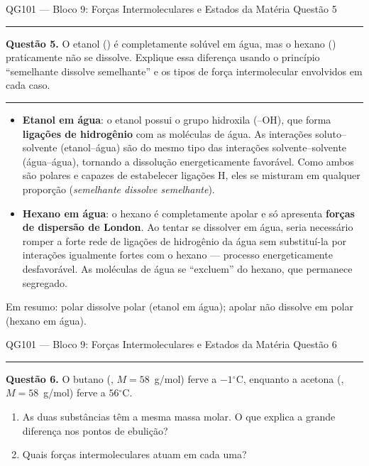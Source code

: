 \documentclass[10pt,a4paper]{article}
\newcommand{\oC}{$^\circ$C}
\newcommand{\questaoheader}[1]{%
  \begin{center}
  {\small\sffamily QG101 --- Bloco 9: Forças Intermoleculares e Estados da Matéria
  \hfill Questão #1}
  \end{center}
  \vspace{-0.3cm}
  \noindent\rule{\textwidth}{0.6pt}
  \vspace{0.1cm}
}
\newcommand{\resolucaosep}{%
  \vspace{0.4cm}
  \noindent\rule{\textwidth}{0.4pt}
  \vspace{0.1cm}

  \noindent{\bf Resolução:}
  \vspace{0.2cm}
}
\begin{document}
\clearpage

\questaoheader{5}

\noindent\textbf{Questão 5.}
O etanol () é completamente solúvel em água, mas o hexano
() praticamente não se dissolve. Explique essa diferença usando
o princípio ``semelhante dissolve semelhante'' e os tipos de força
intermolecular envolvidos em cada caso.

\resolucaosep

\begin{itemize}
  \item \textbf{Etanol em água}: o etanol possui o grupo hidroxila (--OH),
        que forma \textbf{ligações de hidrogênio} com as moléculas de água.
        As interações soluto--solvente (etanol--água) são do mesmo tipo das
        interações solvente--solvente (água--água), tornando a dissolução
        energeticamente favorável. Como ambos são polares e capazes de
        estabelecer ligações H, eles se misturam em qualquer proporção
        (\emph{semelhante dissolve semelhante}).

  \item \textbf{Hexano em água}: o hexano é completamente apolar e só
        apresenta \textbf{forças de dispersão de London}. Ao tentar se
        dissolver em água, seria necessário romper a forte rede de ligações
        de hidrogênio da água sem substituí-la por interações igualmente
        fortes com o hexano --- processo energeticamente desfavorável. As
        moléculas de água se ``excluem'' do hexano, que permanece segregado.
\end{itemize}

Em resumo: polar dissolve polar (etanol em água); apolar não dissolve em
polar (hexano em água).

\clearpage

\questaoheader{6}

\noindent\textbf{Questão 6.}
O butano (, $M = 58$~g/mol) ferve a $-1$\oC, enquanto a acetona
(, $M = 58$~g/mol) ferve a $56$\oC.
\begin{enumerate}
  \item As duas substâncias têm a mesma massa molar. O que explica a
        grande diferença nos pontos de ebulição?
  \item Quais forças intermoleculares atuam em cada uma?
\end{enumerate}
\end{document}
